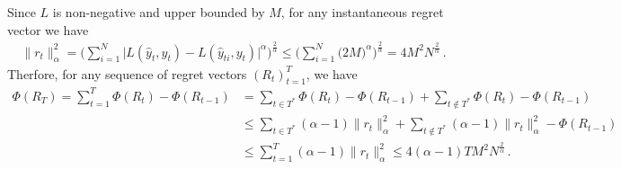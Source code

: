 \documentclass[a4paper]{article}
\begin{document}
Since $L$ is non-negative and upper bounded by $M$, for any instantaneous regret
vector we have
\begin{align*}
  \|r_t\|_\alpha^2
    = \biggl(\sum_{i=1}^N
          \bigl|L(\hat{y}_t, y_t) - L(\hat{y}_{ti}, y_t)\bigr|^\alpha
        \biggr)^\frac{2}{\alpha}
    \leq \biggl(\sum_{i=1}^N \bigl(2M)^\alpha \biggr)^\frac{2}{\alpha}
    = 4 M^2 N^\frac{2}{\alpha} \,.
\end{align*}
Therfore, for any sequence of regret vectors $(R_t)_{t=1}^T$, we have
\begin{align*}
  \Phi(R_T) = \sum_{t=1}^T \Phi(R_t) - \Phi(R_{t-1})
  &= \sum_{t\in T^*} \Phi(R_t) - \Phi(R_{t-1})
  + \sum_{t\notin T^*} \Phi(R_t) - \Phi(R_{t-1}) \\
  &\leq \sum_{t\in T^*} (\alpha-1) \|r_t\|_\alpha^2
  + \sum_{t\notin T^*} (\alpha-1) \|r_t\|_\alpha^2 - \Phi(R_{t-1}) \\
  &\leq \sum_{t=1}^T (\alpha-1) \|r_t\|_\alpha^2
  \leq 4 (\alpha-1) T M^2 N^\frac{2}{\alpha} \,.
\end{align*}
\end{document}
